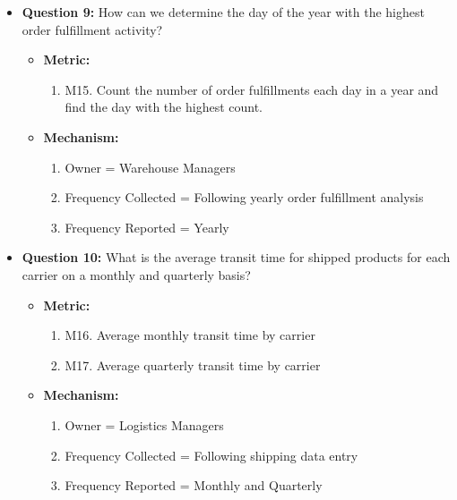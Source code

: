\begin{itemize}[align=left, left=0em,labelsep=0em]
	\item[\textbullet\ ] \textbf{Question 9:} How can we determine the day of the year with the highest order fulfillment activity? 
	\begin{itemize}[align=left, left=0em,labelsep=0em]
		\item[] \textbf{Metric:}
		\begin{enumerate}[label={}, left=0em, labelwidth=1em, labelsep=0em, align=left]
			\item M15. Count the number of order fulfillments each day in a year and find the day with the highest count.
		\end{enumerate}
		\item[] \textbf{Mechanism:}
		\begin{enumerate}[label={}, left=0em, labelwidth=1em, labelsep=0em, align=left]
			\item[i.] Owner = Warehouse Managers
			\item[ii.] Frequency Collected = Following yearly order fulfillment analysis
			\item[iii.] Frequency Reported = Yearly
		\end{enumerate}
	\end{itemize}
	
	\item[\textbullet\ ] \textbf{Question 10:} What is the average transit time for shipped products for each carrier on a monthly and quarterly basis? 
	\begin{itemize}[align=left, left=0em,labelsep=0em]
		\item[] \textbf{Metric:}
		\begin{enumerate}[label={}, left=0em, labelwidth=1em, labelsep=0em, align=left]
			\item M16. Average monthly transit time by carrier
			\item M17. Average quarterly transit time by carrier
		\end{enumerate}
		\item[] \textbf{Mechanism:}
		\begin{enumerate}[label={}, left=0em, labelwidth=1em, labelsep=0em, align=left]
			\item[i.] Owner = Logistics Managers
			\item[ii.] Frequency Collected = Following shipping data entry
			\item[iii.] Frequency Reported = Monthly and Quarterly
		\end{enumerate}
	\end{itemize}
\end{itemize}

